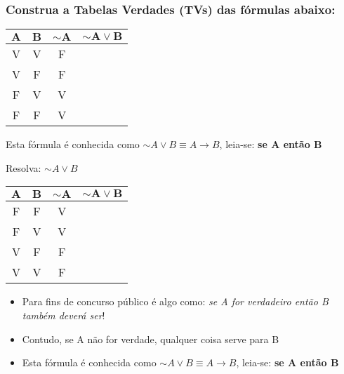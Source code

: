 \documentclass{beamer}
\begin{document}
\begin{frame}
\frametitle{Construa a Tabelas Verdades (TVs) das fórmulas abaixo:}

\begin{block}{}

	\begin{tabular}{|c|c|c|c|}
	\hline
	$\mathbf{A}$ & $\mathbf{B}$ & $\mathbf{\sim A}$ & $\mathbf{\sim A \vee B}$ \\
	\hline
	V & V & F & \\
	\hline
	V & F & F & \\
	\hline
	F & V & V & \\
	\hline
	F & F & V & \\
	\hline
	\end{tabular}
  
  Esta fórmula é conhecida como $\sim A \vee B \equiv A \rightarrow B$, leia-se: \textbf{se A  então B}
\end{block}



\begin{block}{Resolva: $\sim A \vee B$}
\begin{center}

	\begin{tabular}{|c|c|c|c|}
	\hline 	\hline
	$\mathbf{A}$ & $\mathbf{B}$ & $\mathbf{\sim A}$ & $\mathbf{\sim A \vee B}$ \\
	\hline
	F & F & V & \\
  \hline
	F & V & V & \\
	\hline
	V & F & F & \\
	\hline
	V & V & F & \\
	\hline 	\hline
	\end{tabular}
\end{center}
  
\begin{itemize}
   \item Para fins de concurso público é algo como: \textit{se A for verdadeiro então B também deverá ser}!
   \item Contudo, se A não for verdade, qualquer coisa serve para B
    \item  Esta fórmula é conhecida como $\sim A \vee B \equiv A \rightarrow B$, leia-se: \textbf{se A  então B}

  \end{itemize}
  \end{block}


\end{frame}
\end{document}
